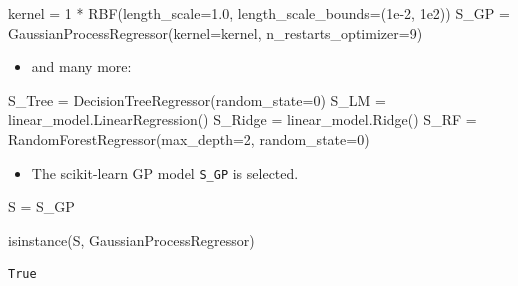 \documentclass[
  letterpaper,
  DIV=11,
  numbers=noendperiod]{scrreprt}
\newenvironment{Shaded}{\begin{snugshade}}{\end{snugshade}}
\newcommand{\BuiltInTok}[1]{\textcolor[rgb]{0.00,0.23,0.31}{#1}}
\newcommand{\DecValTok}[1]{\textcolor[rgb]{0.68,0.00,0.00}{#1}}
\newcommand{\FloatTok}[1]{\textcolor[rgb]{0.68,0.00,0.00}{#1}}
\newcommand{\NormalTok}[1]{\textcolor[rgb]{0.00,0.23,0.31}{#1}}
\newcommand{\OperatorTok}[1]{\textcolor[rgb]{0.37,0.37,0.37}{#1}}
\providecommand{\tightlist}{%
  \setlength{\itemsep}{0pt}\setlength{\parskip}{0pt}}\usepackage{longtable,booktabs,array}
\begin{document}
\begin{Shaded}
\begin{Highlighting}[]
\NormalTok{kernel }\OperatorTok{=} \DecValTok{1} \OperatorTok{*}\NormalTok{ RBF(length\_scale}\OperatorTok{=}\FloatTok{1.0}\NormalTok{, length\_scale\_bounds}\OperatorTok{=}\NormalTok{(}\FloatTok{1e{-}2}\NormalTok{, }\FloatTok{1e2}\NormalTok{))}
\NormalTok{S\_GP }\OperatorTok{=}\NormalTok{ GaussianProcessRegressor(kernel}\OperatorTok{=}\NormalTok{kernel, n\_restarts\_optimizer}\OperatorTok{=}\DecValTok{9}\NormalTok{)}
\end{Highlighting}
\end{Shaded}

\begin{itemize}
\tightlist
\item
  and many more:
\end{itemize}

\begin{Shaded}
\begin{Highlighting}[]
\NormalTok{S\_Tree }\OperatorTok{=}\NormalTok{ DecisionTreeRegressor(random\_state}\OperatorTok{=}\DecValTok{0}\NormalTok{)}
\NormalTok{S\_LM }\OperatorTok{=}\NormalTok{ linear\_model.LinearRegression()}
\NormalTok{S\_Ridge }\OperatorTok{=}\NormalTok{ linear\_model.Ridge()}
\NormalTok{S\_RF }\OperatorTok{=}\NormalTok{ RandomForestRegressor(max\_depth}\OperatorTok{=}\DecValTok{2}\NormalTok{, random\_state}\OperatorTok{=}\DecValTok{0}\NormalTok{) }
\end{Highlighting}
\end{Shaded}

\begin{itemize}
\tightlist
\item
  The scikit-learn GP model \texttt{S\_GP} is selected.
\end{itemize}

\begin{Shaded}
\begin{Highlighting}[]
\NormalTok{S }\OperatorTok{=}\NormalTok{ S\_GP}
\end{Highlighting}
\end{Shaded}

\begin{Shaded}
\begin{Highlighting}[]
\BuiltInTok{isinstance}\NormalTok{(S, GaussianProcessRegressor)}
\end{Highlighting}
\end{Shaded}

\begin{verbatim}
True
\end{verbatim}
\end{document}

